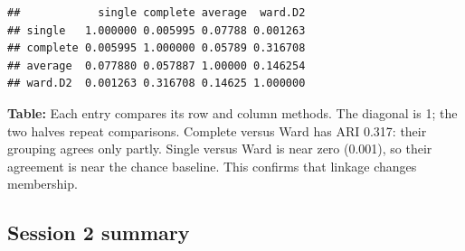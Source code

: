 \documentclass[
  10pt,
]{article}
\newenvironment{Shaded}{\begin{snugshade}}{\end{snugshade}}
\newcommand{\AttributeTok}[1]{\textcolor[rgb]{0.13,0.29,0.53}{#1}}
\newcommand{\CommentTok}[1]{\textcolor[rgb]{0.56,0.35,0.01}{\textit{#1}}}
\newcommand{\ConstantTok}[1]{\textcolor[rgb]{0.56,0.35,0.01}{#1}}
\newcommand{\ControlFlowTok}[1]{\textcolor[rgb]{0.13,0.29,0.53}{\textbf{#1}}}
\newcommand{\DecValTok}[1]{\textcolor[rgb]{0.00,0.00,0.81}{#1}}
\newcommand{\FunctionTok}[1]{\textcolor[rgb]{0.13,0.29,0.53}{\textbf{#1}}}
\newcommand{\NormalTok}[1]{#1}
\newcommand{\OtherTok}[1]{\textcolor[rgb]{0.56,0.35,0.01}{#1}}
\newcommand{\SpecialCharTok}[1]{\textcolor[rgb]{0.81,0.36,0.00}{\textbf{#1}}}
\newcommand{\StringTok}[1]{\textcolor[rgb]{0.31,0.60,0.02}{#1}}
\begin{document}
\begin{Shaded}
\end{Shaded}

\begin{verbatim}
##            single complete average  ward.D2
## single   1.000000 0.005995 0.07788 0.001263
## complete 0.005995 1.000000 0.05789 0.316708
## average  0.077880 0.057887 1.00000 0.146254
## ward.D2  0.001263 0.316708 0.14625 1.000000
\end{verbatim}

\textbf{Table:} Each entry compares its row and column methods. The
diagonal is 1; the two halves repeat comparisons. Complete versus Ward
has ARI 0.317: their grouping agrees only partly. Single versus Ward is
near zero (0.001), so their agreement is near the chance baseline. This
confirms that linkage changes membership.

\subsection{Session 2 summary}\label{session-2-summary}
\end{document}
